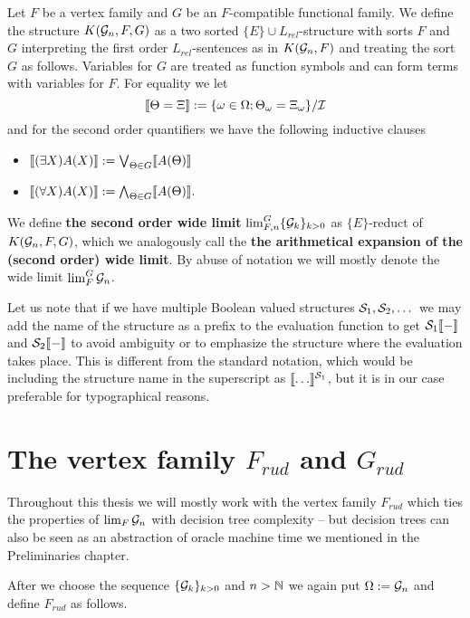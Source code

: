\begin{defi}
Let $F$ be a vertex family and $G$ be an $F$-compatible functional family. We define the structure $K(\G_n,F,G)$ as a two sorted $\{E\}\cup L_{rel}$-structure with sorts $F$ and $G$ interpreting the first order $L_{rel}$-sentences as in $K(\G_n,F)$ and treating the sort $G$ as follows. Variables for $G$ are treated as function symbols and can form terms with variables for $F$. For equality we let
\[\bbl\Theta=\Xi \bbr := \{\omega\in \Omega;\Theta_\omega=\Xi_\omega\}/\I\]
and for the second order quantifiers we have the following inductive clauses
\begin{itemize}
\item $\bbl(\exists X)A(X)\bbr:=\Lor_{\Theta\in G}\bbl A(\Theta)\bbr$
\item $\bbl(\forall X)A(X)\bbr:=\Land_{\Theta\in G}\bbl A(\Theta)\bbr.$
\end{itemize}

We define \textbf{the second order wide limit} $\lim_{F,n}^G\{\G_k\}_{k>0}$ as $\{E\}$-reduct of $K(\G_n,F,G)$, which we analogously call the \textbf{the arithmetical expansion of the (second order) wide limit}. By abuse of notation we will mostly denote the wide limit $\lim_F^G\G_n$.
\end{defi}

Let us note that if we have multiple Boolean valued structures $\S_1,\S_2,\dots$ we may add the name of the structure as a prefix to the evaluation function to get $\S_1\bbl-\bbr$ and $\S_2\bbl-\bbr$ to avoid ambiguity or to emphasize the structure where the evaluation takes place. This is different from the standard notation, which would be including the structure name in the superscript as $\bbl\dots\bbr^{\S_1}$, but it is in our case preferable for typographical reasons.
 
\section{The vertex family $F_{rud}$ and $G_{rud}$}\label{secFrud}

Throughout this thesis we will mostly work with the vertex family $F_{rud}$ which ties the properties of $\lim_F \G_n$ with decision tree complexity -- but decision trees can also be seen as an abstraction of oracle machine time we mentioned in the Preliminaries chapter.

After we choose the sequence $\{\G_k\}_{k>0}$ and $n>\N$ we again put $\Omega:=\G_n$ and define $F_{rud}$ as follows.

